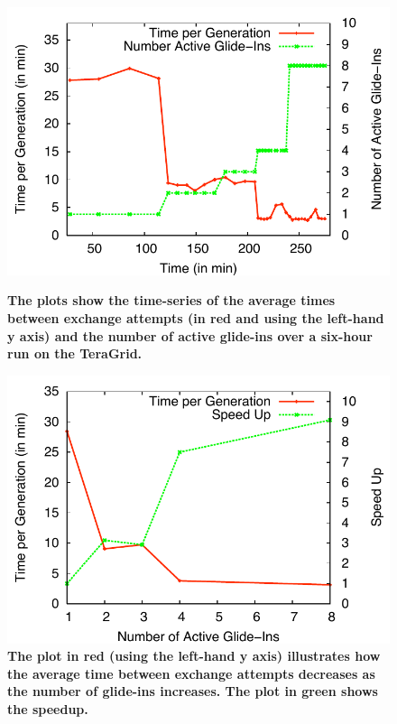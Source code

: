 \documentclass{rspublic}
\begin{document}
\begin{figure}[h]
  \begin{minipage}[t]{.495\textwidth}
    \begin{center}  
      \includegraphics[width=\textwidth]{performance/hepatitis/perf_repex.pdf}
      \caption{\footnotesize \bf The plots show the time-series of the
        average times between exchange attempts (in red and using the
        left-hand y axis) and the number of active glide-ins over a
        six-hour run on the TeraGrid.}
      \label{fig:result_A}
    \end{center}
  \end{minipage}
  \hfill
  \begin{minipage}[t]{.48\textwidth}
    \begin{center}  
      \includegraphics[width=\textwidth]{performance/hepatitis/perf_repex2.pdf}
      \caption{\footnotesize \bf The plot in red (using the left-hand
        y axis) illustrates how the average time between exchange attempts
        decreases as the number of glide-ins increases. The plot in
        green shows the speedup.}
      \label{fig:result_B}
    \end{center}
  \end{minipage}
  \hfill
\end{figure}             
\end{document}
